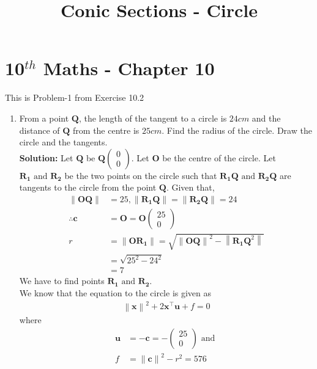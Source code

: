 \documentclass[12pt]{article}
\providecommand{\norm}[1]{\left\lVert#1\right\rVert}
\newcommand{\solution}{\noindent \textbf{Solution: }}
\newcommand{\myvec}[1]{\ensuremath{\begin{pmatrix}#1\end{pmatrix}}}
\let\vec\mathbf
\begin{document}
\begin{center}
\title{\textbf{Conic Sections - Circle}}
\date{\vspace{-5ex}} %
\maketitle
\end{center}
\setcounter{page}{1}

\section{10$^{th}$ Maths - Chapter 10}
This is Problem-1 from Exercise 10.2
\begin{enumerate}
\item From a point $\vec{Q}$, the length of the tangent to a circle is $24 cm$ and the distance of $\vec{Q}$ from the centre is $25 cm$. Find the radius of the circle. Draw the circle and the tangents. \\ 
\solution 
		Let $\vec{Q}$ be $\vec{Q}\myvec{0 \\ 0}$. Let $\vec{O}$ be the centre of the circle. Let $\vec{R_1} \text{ and } \vec{R_2}$ be the two points on the circle such that $\vec{R_1Q} \text{ and } \vec{R_2Q}$ are tangents to the circle from the point $\vec{Q}$. Given that,  
\begin{align}
	\norm{\vec{OQ}} &= 25, \norm{\vec{R_1Q}} = \norm{\vec{R_2Q}} = 24 \\ 
	\therefore \vec{c} &= \vec{O} = \vec{O}\myvec{25 \\ 0} \\
	r &= \norm{\vec{OR_1}} = \sqrt{\norm{\vec{OQ}}^2 - \norm{\vec{R_1Q}^2}}  \\
	&= \sqrt{25^2 - 24^2} \\
	&= 7
\end{align}
We have to find points $\vec{R_1} \text{ and } \vec{R_2}$. \\
We know that the equation to the circle is given as
\begin{align}
	\label{eq:circEq1}
	\norm{\vec{x}}^2+2\vec{x}^\top\vec{u}+f = 0 
\end{align}
where
\begin{align}
	\vec{u} &= -\vec{c}  = -\myvec{25 \\ 0}\text{ and } \\
        \label{eq:fRelation}
	f &= \norm{\vec{c}}^2 - r^2 = 576
\end{align}
\begin{align}

\end{align}
\end{enumerate}
\end{document}
